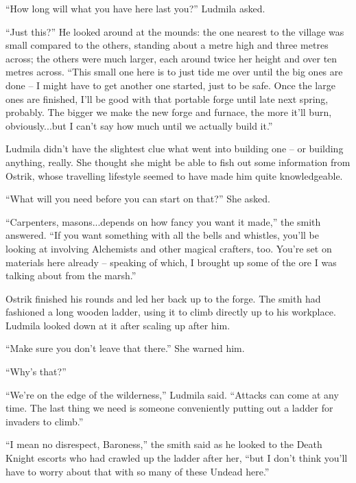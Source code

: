  

“How long will what you have here last you?” Ludmila asked.

 

“Just this?” He looked around at the mounds: the one nearest to the village was small compared to the others, standing about a metre high and three metres across; the others were much larger, each around twice her height and over ten metres across. “This small one here is to just tide me over until the big ones are done – I might have to get another one started, just to be safe. Once the large ones are finished, I’ll be good with that portable forge until late next spring, probably. The bigger we make the new forge and furnace, the more it’ll burn, obviously...but I can’t say how much until we actually build it.”

 

Ludmila didn’t have the slightest clue what went into building one – or building anything, really. She thought she might be able to fish out some information from Ostrik, whose travelling lifestyle seemed to have made him quite knowledgeable.

 

“What will you need before you can start on that?” She asked.

 

“Carpenters, masons...depends on how fancy you want it made,” the smith answered. “If you want something with all the bells and whistles, you’ll be looking at involving Alchemists and other magical crafters, too. You’re set on materials here already – speaking of which, I brought up some of the ore I was talking about from the marsh.”

 

Ostrik finished his rounds and led her back up to the forge. The smith had fashioned a long wooden ladder, using it to climb directly up to his workplace. Ludmila looked down at it after scaling up after him.

 

“Make sure you don’t leave that there.” She warned him.

 

“Why’s that?”

 

“We’re on the edge of the wilderness,” Ludmila said. “Attacks can come at any time. The last thing we need is someone conveniently putting out a ladder for invaders to climb.”

 

“I mean no disrespect, Baroness,” the smith said as he looked to the Death Knight escorts who had crawled up the ladder after her, “but I don’t think you’ll have to worry about that with so many of these Undead here.”

